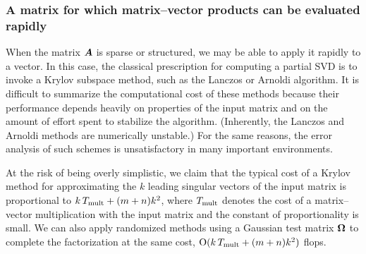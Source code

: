 \documentclass[final]{siamltex}
\newcounter{algorithm}[section]
\begin{document}
\subsubsection{A matrix for which matrix--vector products can be evaluated rapidly}

When the matrix $\bm{A}$ is sparse or structured, we may be able to apply
it rapidly to a vector.  In this case, the classical prescription for computing
a partial SVD is to invoke a Krylov subspace method, such as the Lanczos or Arnoldi
algorithm.  It is difficult to summarize the computational cost of these methods because
their performance depends heavily on properties of the input matrix
and on the amount of effort spent to stabilize the algorithm.
(Inherently, the Lanczos and Arnoldi methods are numerically unstable.)
For the same reasons, the error analysis of such schemes is unsatisfactory
in many important environments.


At the risk of being overly simplistic, we claim that the typical
cost of a Krylov method for approximating the $k$ leading singular vectors
of the input matrix is proportional to $k \, T_{\rm mult} + (m+n) k^2$,
where $T_{\rm mult}$ denotes the cost of a matrix--vector multiplication with
the input matrix and the constant of proportionality is small.
We can also apply randomized methods using a Gaussian test matrix
$\bm{\Omega}$ to complete the factorization at the same cost,
$\mathrm{O}(k \, T_{\rm mult} + (m+n)k^2)$ flops.

\end{document}
